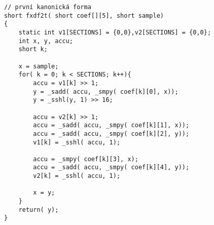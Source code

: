 %
%
%
%
%
%
%
%
%
%
%
\noindent
\begin{minipage}{\linewidth}



\begin{lstlisting}[frame=single,numbers=right,caption={Příklad implementace první kanonické formy v~jazyce C.},label=lst:priklad.vypis.kodu.C,basicstyle=\ttfamily\small, keywordstyle=\color{black}\bfseries\underbar,]
// první kanonická forma
short fxdf2t( short coef[][5], short sample)
{
	static int v1[SECTIONS] = {0,0},v2[SECTIONS] = {0,0};
	int x, y, accu;
	short k;

	x = sample;
	for( k = 0; k < SECTIONS; k++){
		accu = v1[k] >> 1;
		y = _sadd( accu, _smpy( coef[k][0], x));
		y = _sshl(y, 1) >> 16;

		accu = v2[k] >> 1;
		accu = _sadd( accu, _smpy( coef[k][1], x));
		accu = _sadd( accu, _smpy( coef[k][2], y));
		v1[k] = _sshl( accu, 1);

		accu = _smpy( coef[k][3], x);
		accu = _sadd( accu, _smpy( coef[k][4], y));
		v2[k] = _sshl( accu, 1);

		x = y;
	}
	return( y);
}
\end{lstlisting}
\end{minipage}







